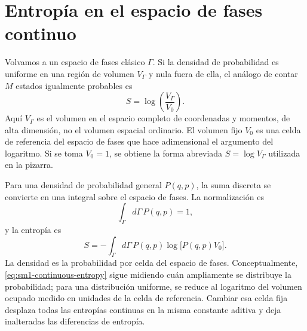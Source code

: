 \begin{classroomqa}
\end{classroomqa}

\section{Entropía en el espacio de fases continuo}

Volvamos a un espacio de fases clásico \(\Gamma\). Si la densidad de probabilidad es uniforme en una región de volumen \(V_\Gamma\) y nula fuera de ella, el análogo de contar \(M\) estados igualmente probables es
\begin{equation}
 S=\log\!\left(\frac{V_\Gamma}{V_0}\right).
 \label{eq:sm1-continuous-uniform}
\end{equation}
Aquí \(V_\Gamma\) es el volumen en el espacio completo de coordenadas y momentos, de alta dimensión, no el volumen espacial ordinario. El volumen fijo \(V_0\) es una celda de referencia del espacio de fases que hace adimensional el argumento del logaritmo. Si se toma \(V_0=1\), se obtiene la forma abreviada \(S=\log V_\Gamma\) utilizada en la pizarra.

Para una densidad de probabilidad general \(P(q,p)\), la suma discreta se convierte en una integral sobre el espacio de fases. La normalización es
\begin{equation}
 \int_\Gamma d\Gamma\,P(q,p)=1,
 \label{eq:sm1-continuous-normalization}
\end{equation}
y la entropía es
\begin{equation}
 S=-\int_\Gamma d\Gamma\,
 P(q,p)\log\!\bigl[P(q,p)V_0\bigr].
 \label{eq:sm1-continuous-entropy}
\end{equation}
La densidad es la probabilidad por celda del espacio de fases. Conceptualmente, \eqref{eq:sm1-continuous-entropy} sigue midiendo cuán ampliamente se distribuye la probabilidad; para una distribución uniforme, se reduce al logaritmo del volumen ocupado medido en unidades de la celda de referencia. Cambiar esa celda fija desplaza todas las entropías continuas en la misma constante aditiva y deja inalteradas las diferencias de entropía.

